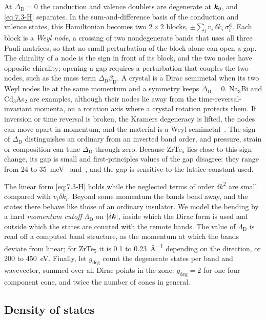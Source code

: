 At $\Delta_{\mathrm{D}} = 0$ the conduction and valence doublets are degenerate at $\bm{k}_0$, and \cref{eq:7.3-H} separates. In the sum-and-difference basis of the conduction and valence states, this Hamiltonian becomes two $2\times2$ blocks, $\pm\sum_iv_i\,\delta k_i\,\sigma^{\mathrm{d}}_i$. Each block is a \emph{Weyl node}, a crossing of two nondegenerate bands that uses all three Pauli matrices, so that no small perturbation of the block alone can open a gap. The chirality of a node is the sign in front of its block, and the two nodes have opposite chirality; opening a gap requires a perturbation that couples the two nodes, such as the mass term $\Delta_{\mathrm{D}}\beta_{\mathrm{D}}$. A crystal is a Dirac semimetal when its two Weyl nodes lie at the same momentum and a symmetry keeps $\Delta_{\mathrm{D}} = 0$. Na$_3$Bi and Cd$_3$As$_2$ are examples, although their nodes lie away from the time-reversal-invariant momenta, on a rotation axis where a crystal rotation protects them. If inversion or time reversal is broken, the Kramers degeneracy is lifted, the nodes can move apart in momentum, and the material is a Weyl semimetal~\cite{armitage2018weyl}. The sign of $\Delta_{\mathrm{D}}$ distinguishes an ordinary from an inverted band order, and pressure, strain or composition can tune $\Delta_{\mathrm{D}}$ through zero. Because ZrTe$_5$ lies close to this sign change, its gap is small and first-principles values of the gap disagree: they range from 24 to \SI{35}{meV}~\cite[Table~1]{geilhufe2020dirac} and~\cite[Table~1]{hochberg2018detection}, and the gap is sensitive to the lattice constant used.

The linear form \cref{eq:7.3-H} holds while the neglected terms of order $\delta k^2$ are small compared with $v_i\delta k_i$. Beyond some momentum the bands bend away, and the states there behave like those of an ordinary insulator. We model the bending by a hard \emph{momentum cutoff} $\Lambda_{\mathrm{D}}$ on $|\delta\bm{k}|$, inside which the Dirac form is used and outside which the states are counted with the remote bands. The value of $\Lambda_{\mathrm{D}}$ is read off a computed band structure, as the momentum at which the bands deviate from linear; for ZrTe$_5$ it is 0.1 to \SI{0.23}{\angstrom^{-1}} depending on the direction, or 200 to \SI{450}{eV}. Finally, let $g_{\mathrm{deg}}$ count the degenerate states per band and wavevector, summed over all Dirac points in the zone: $g_{\mathrm{deg}} = 2$ for one four-component cone, and twice the number of cones in general.

\subsection{Density of states}

